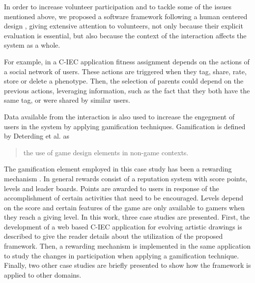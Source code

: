 In order to increase volunteer participation and to tackle some of the issues mentioned above,  
we proposed a software framework following a human centered design \cite{greenhouse2012human},
giving extensive attention to volunteers, not only because their
explicit evaluation is essential, but also because the context of the 
interaction affects the system as a whole.

For example, in a C-IEC application fitness assignment depends on the
actions of a social network of users.  These actions are triggered when 
they tag, share, rate, store or delete a phenotype. 
Then, the selection of parents could depend on the previous actions, leveraging information, 
such as the fact that they both have the same tag, or were shared by
similar users.

Data available from the interaction is also used to increase the engegment of 
users in the system by applying  gamification techniques. Gamification is defined by 
Deterding et al. \cite{deterding2011game} as
\begin{quote}
  the use of game design elements in non-game contexts.
\end{quote}  
The gamification element employed in this case study has been a rewarding mechanism  
\cite{dubois2013understanding}. In general rewards  consist of a reputation system 
with score points, levels and leader boards. Points are awarded to users in response of 
the accomplishment of certain activities that need to be encouraged. Levels depend
on the score and certain features of the game are only available to gamers when 
they reach a giving level. %
In this work, three case studies are presented. First, the development of a web based C-IEC application 
for evolving artistic drawings is described to give the reader details about 
the utilization of the proposed framework. Then, a rewarding mechanism is 
implemented in the same application to study the changes in participation
when applying a gamification technique. Finally, two other case studies are briefly presented
to show how the framework is applied to other domains.

